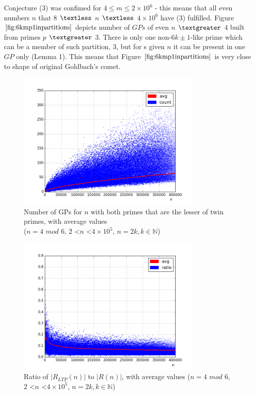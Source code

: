 \documentclass[10pt,twocolumn]{article}
\begin{document}
Conjecture (3) was confimed for $4 \leq m \leq 2 \times 10^6$ - this means that all even numbers $n$ that $8$ $\textless$ $n$ $\textless$ $4 \times 10^6$ have (3) fulfilled. Figure $\ref{fig:6kmp1inpartitions}$ depicts number of $GPs$ of even $n$ $\textgreater$ $4$ built from primes $p$ $\textgreater$ $3$. There is only one non-$6k \pm 1$-like prime which can be a member of such partition, $3$, but for s given $n$ it can be present in one $GP$ only (Lemma 1). This means that Figure $\ref{fig:6kmp1inpartitions}$ is very close to shape of original Goldbach's comet. \par
 \par

\begin{figure}[ht]
\centering
\captionsetup{justification=centering}
\includegraphics[width=9cm]{f_hypo_6km1_in_6n_4}
\caption{ Number of GPs  for $n$ with both primes that are the lesser of twin primes, with average values \\ ($n=4$ $mod$ $6$, $2$ \textless $n$ \textless $4 \times 10^5$, $n = 2k, k \in \mathbb{N}$)}
\label{fig:lessertwinprimesin6n4}
\end{figure}

\begin{figure}[ht]
\centering
\captionsetup{justification=centering}
\includegraphics[width=9cm]{f_lesser_to_all}
\caption{ Ratio of $\left\vert R_{LTP}(n) \right\vert$ to $\left\vert R(n) \right\vert$, with average values ($n=4$ $mod$ $6$, $2$ \textless $n$ \textless $4 \times 10^5$, $n = 2k, k \in \mathbb{N}$)}
\label{fig:lessertwinprimesin6n4_to_all}
\end{figure}
\end{document}
